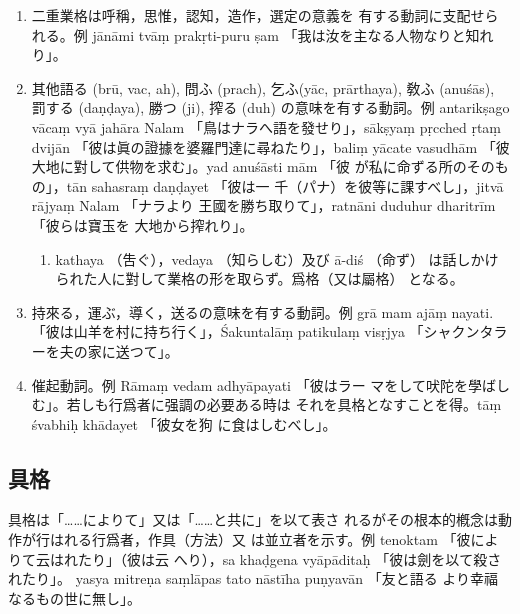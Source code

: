 \numberParagraph
\begin{enumerate}[label=(\arabic*)]
\item 二重業格は呼稱，思惟，認知，造作，選定の意義を
有する動詞に支配せられる。例 jānāmi tvāṃ prakṛti-puru\-%
ṣam 「我は汝を主なる人物なりと知れり」。
\item 其他語る (brū, vac, ah), 問ふ (prach), 乞ふ(yāc,
prārthaya), 敎ふ (anuśās), 罰する (daṇḍaya), 勝つ (ji),
搾る (duh) の意味を有する動詞。例 antarikṣago vācaṃ vyā\-%
jahāra Nalam 「鳥はナラへ語を發せり」，sākṣyaṃ pṛcched
ṛtaṃ dvijān 「彼は眞の證據を婆羅門達に尋ねたり」，baliṃ yācate
vasudhām 「彼大地に對して供物を求む」。yad anuśāsti mām 「彼
が私に命ずる所のそのもの」，tān sahasraṃ daṇḍayet 「彼は一
千（パナ）を彼等に課すべし」，jitvā rājyaṃ Nalam 「ナラより
王國を勝ち取りて」，ratnāni duduhur dharitrīm 「彼らは寶玉を
大地から搾れり」。
\begin{enumerate}[label=(\alph*)]
\item kathaya （吿ぐ），vedaya （知らしむ）及び ā-diś （命ず）
は話しかけられた人に對して業格の形を取らず。爲格（又は屬格）
となる。
\end{enumerate}
\item 持來る，運ぶ，導く，送るの意味を有する動詞。例 grā\-%
mam ajāṃ nayati. 「彼は山羊を村に持ち行く」，Śakuntalāṃ
patikulaṃ visṛjya 「シャクンタラーを夫の家に送つて」。
\item 催起動詞。例 Rāmaṃ vedam adhyāpayati 「彼はラー
マをして吠陀を學ばしむ」。若しも行爲者に强調の必要ある時は
それを具格となすことを得。tāṃ śvabhiḥ khādayet 「彼女を狗
に食はしむべし」。
\end{enumerate}

\subsection{具格}
\numberParagraph
具格は「……によりて」又は「……と共に」を以て表さ
れるがその根本的槪念は動作が行はれる行爲者，作具（方法）又
は並立者を示す。例 tenoktam 「彼によりて云はれたり」（彼は云
へり），sa khaḍgena vyāpāditaḥ 「彼は劍を以て殺されたり」。
yasya mitreṇa saṃlāpas tato nāstīha puṇyavān 「友と語る
より幸福なるもの世に無し」。


